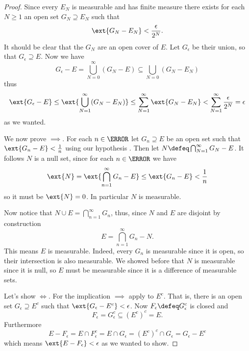 \documentclass[12pt,oneside]{book}
\begin{document}
{\begin{proof}
	Since every \( E_N \) is measurable and has finite measure there exists for each \( N
	\geq 1 \) an open set \( G_N \supseteq E_N \) such that
	\begin{equation*}
		\ext{G_N - E_N} < \frac{\epsilon}{2^N}.
	\end{equation*}
	It should be clear that the \( G_N \) are an open cover of \( E \). Let \( G_\epsilon \)
	be their union, so that \( G_\epsilon \supseteq E \). Now we have
	\begin{equation*}
		G_\epsilon - E = \bigcup_{N = 0}^\infty (G_N - E) \subseteq \bigcup_{N = 0} (G_N -
		E_N)
	\end{equation*}
	thus
	\begin{equation*}
		\ext{G_\epsilon - E} \leq \ext{\bigcup_{N = 1}^\infty(G_N - E_N)} \leq \sum_{N = 1}^{\infty}
		\ext{G_N - E_N} < \sum_{N = 1}^{\infty} \frac{\epsilon}{2^N} = \epsilon  
	\end{equation*}
	as we wanted.	

	We now prove \( \implies \).	For each \( n \in \N \) let \( G_n
	\supseteq E \) be an open set such that \( \ext{G_n - E} < \frac{1}{n} \) using our
	hypothesis . Then let \( N \defeq \bigcap_{N = 1}^\infty G_N - E \). It
	follows \( N \) is a null set, since for each \( n \in \N \) we have
	\begin{equation*}
		\ext{N} = \ext{\bigcap_{n = 1}^\infty G_n - E} \leq \ext{G_n - E} < \frac{1}{n}
	\end{equation*}
	so it must be \( \ext{N} = 0 \). In particular \( N \) is measurable. 

	Now notice that \( N \cup E = \bigcap_{n = 1}^\infty G_n \), thus, since \( N \) and \( E
	\) are disjoint by construction
	\begin{equation}\label{eq:measurable set is intersection of open sets minus null set}
		E = \bigcap_{n = 1}^{\infty} G_n - N.
	\end{equation}
	This means \( E \) is measurable. Indeed, every \( G_n \) is measurable since it is
	open, so their intersection is also measurable. We showed before that \( N \) is
	measurable since it is null, so \( E \) must be measurable since it is a difference of
	measurable sets.

	\parbreak

	Let's show \( \iff \). For the implication
	\( \implies \) apply  to \( E^c \). That is,
	there is an open set \( G_\epsilon \supseteq E^c \) such that \( \ext{G_\epsilon - E^c}
	< \epsilon \). Now \( F_\epsilon \defeq G_\epsilon^c \) is closed and
	\begin{equation*}
		F_\epsilon = G_\epsilon^c \subseteq (E^c)^c = E.
	\end{equation*}
	Furthermore
	\begin{equation*}
		E - F_\epsilon = E \cap F_\epsilon^c = E \cap G_\epsilon = (E^c)^c \cap G_\epsilon =
		G_\epsilon - E^c
	\end{equation*}
	which means \( \ext{E - F_\epsilon} < \epsilon \) as we wanted to show. 


\end{proof}}
\end{document}
